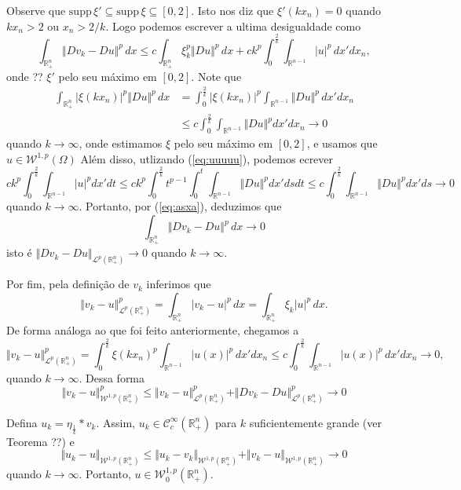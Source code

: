 \documentclass[a4paper, 11pt]{book}
\theoremstyle{definition}
\newcommand{\bR}{\mathbb{R}}
\newcommand{\cC}{\mathcal{C}}
\newcommand{\cL}{\mathcal{L}}
\newcommand{\cW}{\mathcal{W}}
\newcommand{\supp}{\mathrm{supp}\,}
\begin{document}
\begin{prf}
    Observe que $\supp \xi' \subseteq \supp \xi \subseteq [0,2]$. Isto nos diz que $\xi'(kx_n) = 0$ quando $kx_n > 2$ ou $x_n > 2/k$.
    Logo podemos escrever a ultima desigualdade como
    \[
        \int_{\bR^n_+} \Vert Dv_k - Du \Vert^p \,dx \leqslant c \int_{\bR^{n}_+} \xi_k^p \Vert Du \Vert^p \,dx + ck^p \int_{0}^{\frac{2}{k}} \int_{\bR^{n-1}} |u|^p \,dx'dx_n,
    \]
    onde ?? $\xi'$ pelo seu máximo em $[0,2]$.
    Note que
    \[
        \begin{aligned}
            \int_{\bR^{n}_+} |\xi(kx_n)|^p \Vert Du \Vert^p \,dx &= \int_{0}^{\frac{2}{k}} |\xi(kx_n)|^p \int_{\bR^{n-1}} \Vert Du \Vert^p \,dx' dx_n\\
            &\leqslant c \int_{0}^{\frac{2}{k}} \int_{\bR^{n-1}} \Vert Du \Vert^p dx' dx_n \longrightarrow 0
        \end{aligned}
    \]
    quando $k \to \infty$, onde estimamos $\xi$ pelo seu máximo em $[0,2]$, e usamos que $u \in \cW^{1,p}(\Omega)$ 
    Além disso, utlizando (\ref{eq:uuuuu}), podemos ecrever
    \[
        ck^p \int_{0}^{\frac{2}{k}} \int_{\bR^{n-1}} |u|^p dx'dt \leqslant ck^p \int_{0}^{\frac{2}{k}} t^{p-1} \int_{0}^{t} \int_{\bR^{n-1}} \Vert Du \Vert^p dx'ds dt \leqslant c \int_0^{\frac{2}{k}} \int_{\bR^{n-1}} \Vert Du \Vert^p dx'ds \to 0
    \]
    quando $k \to \infty$.
    Portanto, por (\ref{eq:asxa}), deduzimos que
    \[
        \int_{\bR^n_+} \Vert Dv_k - Du \Vert^p \,dx \to 0
    \]
    isto é $\Vert Dv_k - Du \Vert_{\cL^p(\bR^n_+)} \to 0$ quando $k \to \infty$.

    Por fim, pela definição de $v_k$ inferimos que
    \[
        \Vert v_k - u \Vert_{\cL^p(\bR^n_+)}^p = \int_{\bR^n_+} |v_k - u|^p \,dx = \int_{\bR^n_+} \xi_k|u|^p \,dx.
    \]
    De forma análoga ao que foi feito anteriormente, chegamos a
    \[
        \Vert v_k - u \Vert_{\cL^p(\bR^n_+)}^p = \int_{0}^{\frac{2}{k}} \xi(kx_n)^p \int_{\bR^{n-1}} |u(x)|^p \,dx'dx_n \leqslant c \int_{0}^{\frac{2}{k}} \int_{\bR^{n-1}} |u(x)|^p \, dx'dx_n \to 0,
    \]
    quando $k \to \infty$. Dessa forma
    \[
        \Vert v_k - u \Vert_{\cW^{1,p}(\bR^n_+)}^p \leqslant \Vert v_k - u \Vert_{\cL^{p}(\bR^n_+)}^p + \Vert Dv_k - Du \Vert_{\cL^{p}(\bR^n_+)}^p \to 0
    \]

    Defina $u_k = \eta_{\frac{1}{k}} * v_k$. Assim, $u_k \in \cC^{\infty}_c(\bR^n_+)$ para $k$ suficientemente grande (ver Teorema ??) e 
    \[
        \Vert u_k - u \Vert_{\cW^{1,p}(\bR^n_+)} \leqslant \Vert u_k - v_k \Vert_{\cW^{1,p}(\bR^n_+)} + \Vert v_k - u \Vert_{\cW^{1,p}(\bR^n_+)} \to 0
    \]
    quando $k \to \infty$.
    Portanto, $u \in \cW^{1,p}_0(\bR^n_+)$.
\end{prf}
\end{document}
